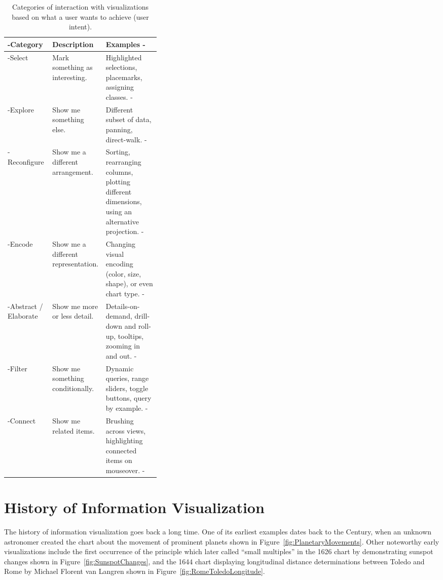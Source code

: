 \begin{table}[tp]
\tablestretch
{}
\centering
\begin{small}
\begin{tabularx}{\linewidth}{>{\kern-\tabcolsep}lL{0.35\linewidth}X<{\kern-\tabcolsep}}
\toprule
Category & Description & Examples \\
\midrule
Select &
  Mark something as interesting. &
  Highlighted selections, placemarks, assigning classes. \\
Explore &
  Show me something else. &
  Different subset of data, panning, direct-walk. \\
Reconfigure &
  Show me a different arrangement. &
  Sorting, rearranging columns, plotting different dimensions, using an alternative projection. \\
Encode &
  Show me a different representation. &
  Changing visual encoding (color, size, shape), or even chart type. \\
Abstract / Elaborate &
  Show me more or less detail. &
  Details-on-demand, drill-down and roll-up, tooltips, zooming in and out. \\
Filter &
  Show me something conditionally. &
  Dynamic queries, range sliders, toggle buttons, query by example. \\
Connect &
  Show me related items. &
  Brushing across views, highlighting connected items on mouseover. \\
\bottomrule
\end{tabularx}
\end{small}
\caption[Categories of Interaction Based on User Intent]{
Categories of interaction with visualizations based on what
a user wants to achieve (user intent).
}
\label{tab:UserIntentCategories}
\end{table}






\section{History of Information Visualization}

The history of information visualization goes back a long time. One of
its earliest examples dates back to the  Century, when an
unknown astronomer created the chart about the movement of prominent
planets \parencite{CommentariiInSomniumScipionis} shown in
Figure~\ref{fig:PlanetaryMovements}.
Other noteworthy early visualizations include the first occurrence of
the principle which \textcite{VisualDisplayOfQuantitativeInformation}
later called \enquote{small multiples} in the 1626 chart by
\textcite{RosaUrsina} demonstrating sunspot changes shown in
Figure~\ref{fig:SunspotChanges}, and the 1644 chart displaying
longitudinal distance determinations between Toledo and Rome by
Michael Florent van Langren shown in
Figure~\ref{fig:RomeToledoLongitude}.


